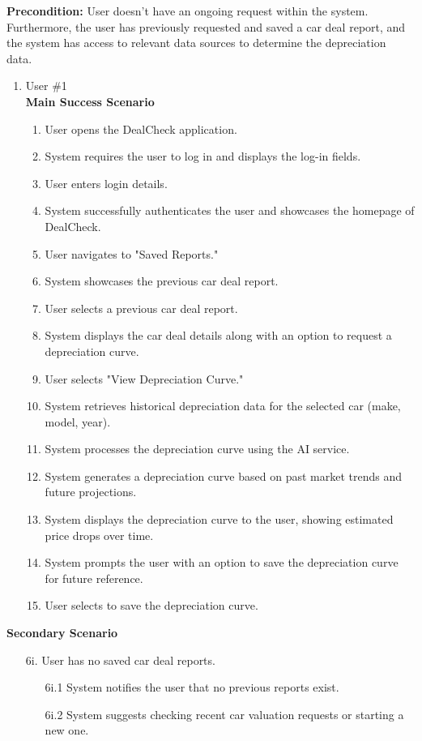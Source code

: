\documentclass[]{article}
\begin{document}
\begin{enumerate}[{\bf {BE}1.}]
{\bf Precondition:} User doesn't have an ongoing request within the system. Furthermore, the user has previously requested and saved a car deal report, and the system 
	has access to relevant data sources to determine the depreciation data.
	\begin{enumerate}[{\bf VP1.}]
		\item User \#1 \\
		{\bf Main Success Scenario}
		\begin{enumerate}[1.]
			\item User opens the DealCheck application.
			\item System requires the user to log in and displays the log-in fields.
			\item User enters login details.
			\item System successfully authenticates the user and showcases the homepage of DealCheck.
			\item User navigates to "Saved Reports."
			\item System showcases the previous car deal report.
			\item User selects a previous car deal report.
			\item System displays the car deal details along with an option to request a depreciation curve.
			\item User selects "View Depreciation Curve."
			\item System retrieves historical depreciation data for the selected car (make, model, year).
			\item System processes the depreciation curve using the AI service.
			\item System generates a depreciation curve based on past market trends and future projections.
			\item System displays the depreciation curve to the user, showing estimated price drops over time.
			\item System prompts the user with an option to save the depreciation curve for future reference.
			\item User selects to save the depreciation curve.
		\end{enumerate}
	\end{enumerate}
		{\bf Secondary Scenario}
		\begin{enumerate}
			\item[6i.] User has no saved car deal reports.
			\begin{enumerate}
				\item[6i.1] System notifies the user that no previous reports exist.
				\item[6i.2] System suggests checking recent car valuation requests or starting a new one.
			\end{enumerate}
			

\end{enumerate}
\end{enumerate}
\end{document}
